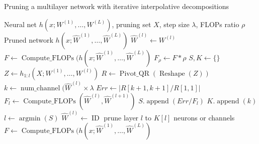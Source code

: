 \begin{algorithm}[t]{\small
\caption{Pruning a multilayer network with iterative interpolative decompositions}
\begin{algorithmic}
\label{alg:deepIDIter}
\REQUIRE
Neural net $h(x; W^{(1)},\ldots,W^{(L)})$,
pruning set $X$,
step size $\lambda$,
FLOPs ratio $\rho$
\ENSURE
Pruned network $h(x; \widehat{W}^{(1)},\ldots,\widehat{W}^{(L)})$
\vspace{0.5em}
\STATE $\widehat{W}^{(l)} \gets W^{(l)}$
\ENDFOR
\STATE $F \gets \operatorname{Compute\_FLOPs}(h(x; \widehat{W}^{(1)},\ldots,\widehat{W}^{(L)})$
\STATE $F_\rho \gets F * \rho$
\STATE $S, K \gets \{\}$
\STATE $Z \gets h_{1:l}(X; W^{(1)}, \dots, W^{(l)})$
\STATE $R \gets \operatorname{Pivot\_QR}(\operatorname{Reshape}(Z))$
\STATE $k \gets \operatorname{num\_channel}(\widehat{W}^{(l)} \times \lambda$
\STATE $Err \gets |R[k+1,k+1]/R[1,1]|$
\STATE $F_l \gets \operatorname{Compute\_FLOPs}(\widehat{W}^{(l)}, \widehat{W}^{(l+1)})$
\STATE $S.\operatorname{append}(Err / F_l)$
\STATE $K.\operatorname{append}(k)$
\ENDFOR
\STATE $l \gets \operatorname{argmin}(S)$
\STATE $\widehat{W}^{(l)} \gets \operatorname{ID}$ prune layer $l$ to $K[l]$ neurons or channels
\STATE $F \gets \operatorname{Compute\_FLOPs}(h(x; \widehat{W}^{(1)},\ldots,\widehat{W}^{(L)})$
\ENDWHILE
\end{algorithmic}
}\end{algorithm}
